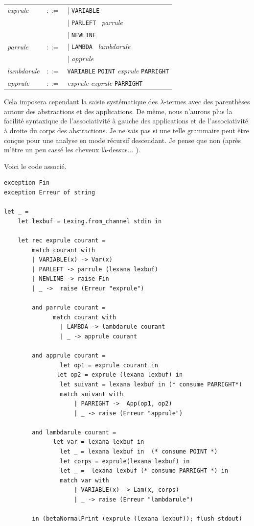  
\vspace{0.5cm}
\begin{tabular}{lll}
\textit{exprule} & $::=$ & | \verb+VARIABLE+  \\
					  &	    & | \verb+PARLEFT+ \  \textit{parrule} \\
					  & 		 & | \verb+NEWLINE+ \\
\textit{parrule} & $::=$ & | \verb+LAMBDA+ \ \textit{lambdarule}  \\
					  &       & | \textit{apprule} \\ 
\textit{lambdarule} & $::=$ & \verb+VARIABLE+  \verb+POINT+  \textit{exprule}  \verb+PARRIGHT+ \\
\textit{apprule} & $::=$    &  \textit{exprule} \textit{exprule}  \verb+PARRIGHT+ \\
\end{tabular}
\vspace{0.5cm}

Cela imposera cependant la saisie systématique des $\lambda$-termes avec des parenthèses autour des abstractions et des applications.
De même, nous n'aurons plus la facilité syntaxique de l'associativité à gauche des applications et de l'associativité à droite
du corps des abstractions.
Je ne sais pas si une telle grammaire peut être conçue pour une analyse en mode
récursif descendant.
Je pense que non (après m'être un peu cassé les cheveux là-dessus... ). 

Voici le code associé.
\begin{Verbatim}
exception Fin
exception Erreur of string
	
let _ =
	let lexbuf = Lexing.from_channel stdin in
				
	let rec exprule courant =
		match courant with
		| VARIABLE(x) -> Var(x)
		| PARLEFT -> parrule (lexana lexbuf)
		| NEWLINE -> raise Fin
		| _ ->  raise (Erreur "exprule")
		
		and parrule courant =
			  match courant with
				| LAMBDA -> lambdarule courant
				| _ -> apprule courant
		 
		and apprule courant =
				let op1 = exprule courant in
			   let op2 = exprule (lexana lexbuf) in
				let suivant = lexana lexbuf in (* consume PARRIGHT*)
				match suivant with 
					| PARRIGHT ->  App(op1, op2) 
					| _ -> raise (Erreur "apprule")
		 
		and lambdarule courant =
			  let var = lexana lexbuf in 
				let _ = lexana lexbuf in  (* consume POINT *)
				let corps = exprule(lexana lexbuf) in
				let _ =  lexana lexbuf (* consume PARRIGHT *) in
				match var with 
					| VARIABLE(x) -> Lam(x, corps)
					| _ -> raise (Erreur "lambdarule")
			
		in (betaNormalPrint (exprule (lexana lexbuf)); flush stdout)
\end{Verbatim}

